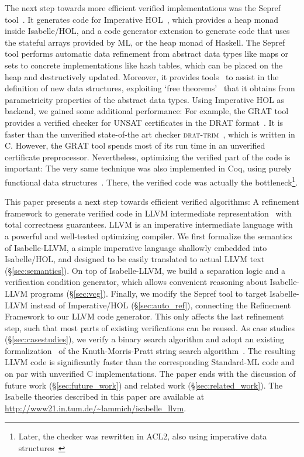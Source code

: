 \documentclass[a4paper,USenglish,cleveref, autoref]{lipics-v2019}
\begin{document}
The next step towards more efficient verified implementations was the Sepref tool~\cite{La15}. 
It generates code for Imperative HOL~\cite{BKHEM08}, which provides a heap monad inside Isabelle/HOL, 
and a code generator extension to generate code that uses the stateful arrays provided by ML, or the heap monad of Haskell.
The Sepref tool performs automatic data refinement from abstract data types like maps or sets to concrete implementations like hash tables, which 
can be placed on the heap and destructively updated. 
Moreover, it provides tools~\cite{La16} to assist in the definition of new data structures, exploiting `free theorems'~\cite{Wad89} that it 
obtains from parametricity properties of the abstract data types.
%
Using Imperative HOL as backend, we gained some additional performance: For example, the GRAT tool~\cite{La17_CADE,La17_SAT} provides a 
verified checker for UNSAT certificates in the DRAT format~\cite{WHH14}. It is faster than the unverified state-of-the art 
checker \textsc{drat-trim}~\cite{WHH14}, which is written in C. However, the GRAT tool spends most of its run time in an unverified 
certificate preprocessor. Nevertheless, optimizing the verified part of the code is important: The very same technique was also implemented in Coq,
using purely functional data structures~\cite{CMS17,CHHKS17}. There, the verified code was actually the 
bottleneck\footnote{Later, the checker was rewritten in ACL2, also using imperative data structures~\cite{CHHKS17,HHKW17}}.

This paper presents a next step towards efficient verified algorithms: A refinement framework to generate verified code in LLVM intermediate representation~\cite{LLVM-manual} 
with total correctness guarantees. LLVM is an imperative intermediate language with a powerful and well-tested optimizing compiler.
We first formalize the semantics of Isabelle-LLVM, a simple imperative language shallowly embedded into Isabelle/HOL, 
and designed to be easily translated to actual LLVM text (\S\ref{sec:semantics}). 
On top of Isabelle-LLVM, we build a separation logic and a verification condition generator, which allows convenient reasoning about Isabelle-LLVM programs (\S\ref{sec:vcg}).
Finally, we modify the Sepref tool to target Isabelle-LLVM instead of Imperative/HOL (\S\ref{sec:auto_ref}), connecting 
the Refinement Framework to our LLVM code generator. This only affects the last refinement step, 
such that most parts of existing verifications can be reused. 
As case studies (\S\ref{sec:casestudies}), we verify a binary search algorithm and adopt an existing formalization~\cite{HeLa17} of
the Knuth-Morris-Pratt string search algorithm~\cite{KMP77}. The resulting LLVM code is significantly
faster than the corresponding Standard-ML code and on par with unverified C implementations.
The paper ends with the discussion of future work (\S\ref{sec:future_work}) and related work (\S\ref{sec:related_work}).
%
The Isabelle theories described in this paper are available at \url{http://www21.in.tum.de/~lammich/isabelle_llvm}. 
\end{document}

